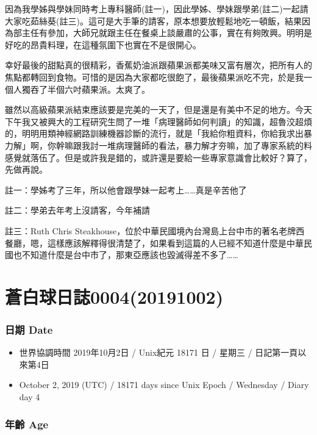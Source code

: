\documentclass[a5paper, 12pt
]{book}
\providecommand{\tightlist}{%
  \setlength{\itemsep}{0pt}\setlength{\parskip}{0pt}}
\begin{document}
因為我學姊與學妹同時考上專科醫師(註一)，因此學姊、學妹跟學弟(註二)一起請大家吃茹絲葵(註三)。這可是大手筆的請客，原本想要放輕鬆地吃一頓飯，結果因為部主任有參加，大師兄就跟主任在餐桌上談嚴肅的公事，實在有夠敗興。明明是好吃的昂貴料理，在這種氛圍下也實在不是很開心。

幸好最後的甜點真的很精彩，香蕉奶油派跟蘋果派都美味又富有層次，把所有人的焦點都轉回到食物。可惜的是因為大家都吃很飽了，最後蘋果派吃不完，於是我一個人獨吞了半個六吋蘋果派。太爽了。

雖然以高級蘋果派結束應該要是完美的一天了，但是還是有美中不足的地方。今天下午我又被興大的工程研究生問了一堆「病理醫師如何判讀」的知識，超魯洨超煩的，明明用類神經網路訓練機器診斷的流行，就是「我給你粗資料，你給我求出暴力解」啊，你幹嘛跟我討一堆病理醫師的看法，暴力解才夯嘛，加了專家系統的料感覺就落伍了。但是或許我是錯的，或許還是要給一些專家意識會比較好？算了，先做再說。

註一：學姊考了三年，所以他會跟學妹一起考上\ldots\ldots 真是辛苦他了

註二：學弟去年考上沒請客，今年補請

註三：Ruth Chris
Steakhouse，位於中華民國境內台灣島上台中市的著名老牌西餐廳，嗯，這樣應該解釋得很清楚了，如果看到這篇的人已經不知道什麼是中華民國也不知道什麼是台中市了，那東亞應該也毀滅得差不多了\ldots\ldots{}

\hypertarget{ux84bcux767dux7403ux65e5ux8a8c000420191002}{%
\section{蒼白球日誌0004(20191002)}\label{ux84bcux767dux7403ux65e5ux8a8c000420191002}}

\hypertarget{ux65e5ux671f-date-3}{%
\subsubsection{日期 Date}\label{ux65e5ux671f-date-3}}

\begin{itemize}
\tightlist
\item
  世界協調時間 2019年10月2日 / Unix紀元 18171 日 / 星期三 /
  日記第一頁以來第4日
\item
  October 2, 2019 (UTC) / 18171 days since Unix Epoch / Wednesday /
  Diary day 4
\end{itemize}

\hypertarget{ux5e74ux9f61-age-3}{%
\subsubsection{年齡 Age}\label{ux5e74ux9f61-age-3}}
\end{document}

